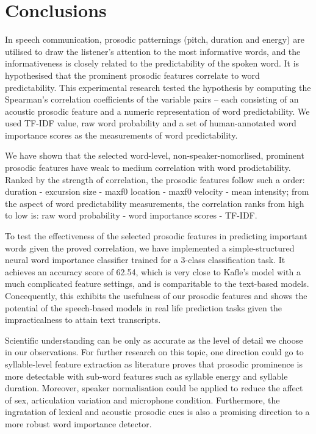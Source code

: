 \chapter{Conclusions}


In speech communication, prosodic patternings (pitch, duration and energy) are utilised to draw the listener's attention to the most informative words, and the informativeness is closely related to the predictability of the spoken word. It is hypothesised that the prominent prosodic features correlate to word predictability. This experimental research tested the hypothesis by computing the Spearman's correlation coefficients of the variable pairs -- each consisting of an acoustic prosodic feature and a numeric representation of word predictability. We used TF-IDF value, raw word probability and a set of human-annotated word importance scores as the measurements of word predictability.

We have shown that the selected word-level, non-speaker-nomorlised, prominent prosodic features have weak to medium correlation with word prodictability. Ranked by the strength of correlation, the prosodic features follow such a order: duration - excursion size - maxf0 location - maxf0 velocity - mean intensity; from the aspect of word predictability measurements, the correlation ranks from high to low is: raw word probability - word importance scores - TF-IDF.

To test the effectiveness of the selected prosodic features in predicting important words given the proved correlation, we have implemented a simple-structured neural word importance classifier trained for a 3-class classification task. It achieves an accuracy score of 62.54, which is very close to Kafle's model with a much complicated feature settings, and is comparitable to the text-based models. Concequently, this exhibits the usefulness of our prosodic features and shows the potential of the speech-based models in real life prediction tasks given the impracticalness to attain text transcripts.

Scientific understanding can be only as accurate as the level of detail we choose in our observations. For further research on this topic, one direction could go to syllable-level feature extraction as literature proves that prosodic prominence is more detectable with sub-word features such as syllable energy and syllable duration. Moreover, speaker normalisation could be applied to reduce the affect of sex, articulation variation and microphone condition. Furthermore, the ingratation of lexical and acoustic prosodic cues is also a promising direction to a more robust word importance detector.

